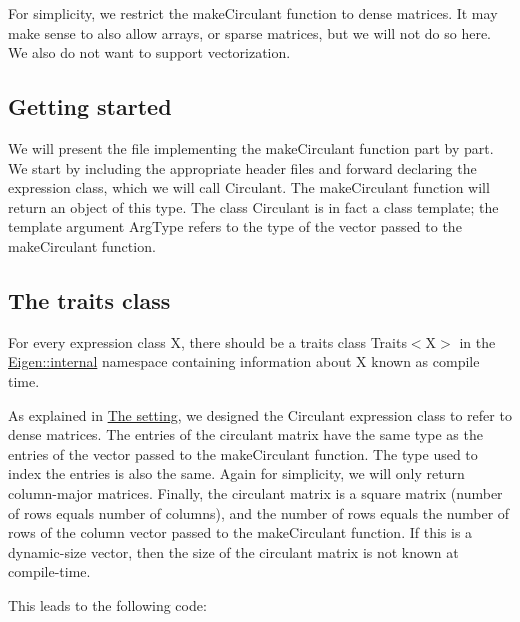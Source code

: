 For simplicity, we restrict the {\ttfamily make\+Circulant} function to dense matrices. It may make sense to also allow arrays, or sparse matrices, but we will not do so here. We also do not want to support vectorization.\hypertarget{_topic_new_expression_type_TopicPreamble}{}\subsection{Getting started}\label{_topic_new_expression_type_TopicPreamble}
We will present the file implementing the {\ttfamily make\+Circulant} function part by part. We start by including the appropriate header files and forward declaring the expression class, which we will call {\ttfamily Circulant}. The {\ttfamily make\+Circulant} function will return an object of this type. The class {\ttfamily Circulant} is in fact a class template; the template argument {\ttfamily Arg\+Type} refers to the type of the vector passed to the {\ttfamily make\+Circulant} function.


\begin{DoxyCodeInclude}
\end{DoxyCodeInclude}
\hypertarget{_topic_new_expression_type_TopicTraits}{}\subsection{The traits class}\label{_topic_new_expression_type_TopicTraits}
For every expression class {\ttfamily X}, there should be a traits class {\ttfamily Traits$<$\+X$>$} in the {\ttfamily \hyperlink{namespace_eigen_1_1internal}{Eigen\+::internal}} namespace containing information about {\ttfamily X} known as compile time.

As explained in \hyperlink{_topic_new_expression_type_TopicSetting}{The setting}, we designed the {\ttfamily Circulant} expression class to refer to dense matrices. The entries of the circulant matrix have the same type as the entries of the vector passed to the {\ttfamily make\+Circulant} function. The type used to index the entries is also the same. Again for simplicity, we will only return column-\/major matrices. Finally, the circulant matrix is a square matrix (number of rows equals number of columns), and the number of rows equals the number of rows of the column vector passed to the {\ttfamily make\+Circulant} function. If this is a dynamic-\/size vector, then the size of the circulant matrix is not known at compile-\/time.

This leads to the following code\+:


